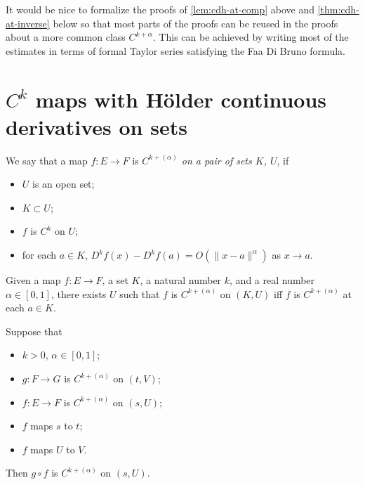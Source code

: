 \begin{remark}
  It would be nice to formalize the proofs of \autoref{lem:cdh-at-comp} above
  and \autoref{thm:cdh-at-inverse} below
  so that most parts of the proofs
  can be reused in the proofs about a more common class \(C^{k+\alpha}\).
  This can be achieved by writing most of the estimates
  in terms of formal Taylor series satisfying the Faa Di Bruno formula.
\end{remark}

\section{\(C^{k}\) maps with Hölder continuous derivatives on sets}%
\label{sec:chd-on}

\begin{definition}%
  \label{def:cdh-on}
  We say that a map \(f\colon E\to F\) is \emph{\(C^{k+(\alpha)}\) on a pair of sets \(K\), \(U\)}, if
  \begin{itemize}
  \item \(U\) is an open set;
  \item \(K \subset U\);
  \item \(f\) is \(C^{k}\) on \(U\);
  \item for each \(a \in K\), \(D^{k}f(x) - D^{k}f(a) = O(\|x - a\|^{\alpha})\) as \(x\to a\).
  \end{itemize}
\end{definition}

\begin{lemma}%
  \label{lem:exists-cdh-on}
  Given a map \(f\colon E \to F\), a set \(K\), a natural number \(k\), and a real number \(\alpha \in [0, 1]\),
  there exists \(U\) such that \(f\) is \(C^{k+(\alpha)}\) on \((K, U)\)
  iff \(f\) is \(C^{k+(\alpha)}\) at each \(a \in K\).
\end{lemma}

\begin{lemma}%
  \label{lem:cdh-on-comp}
  Suppose that
  \begin{itemize}
  \item \(k > 0\), \(\alpha \in [0, 1]\);
  \item \(g\colon F\to G\) is \(C^{k+(\alpha)}\) on \((t, V)\);
  \item \(f\colon E\to F\) is \(C^{k+(\alpha)}\) on \((s, U)\);
  \item \(f\) maps \(s\) to \(t\);
  \item \(f\) maps \(U\) to \(V\).
  \end{itemize}
  Then \(g\circ f\) is \(C^{k+(\alpha)}\) on \((s, U)\).
\end{lemma}

